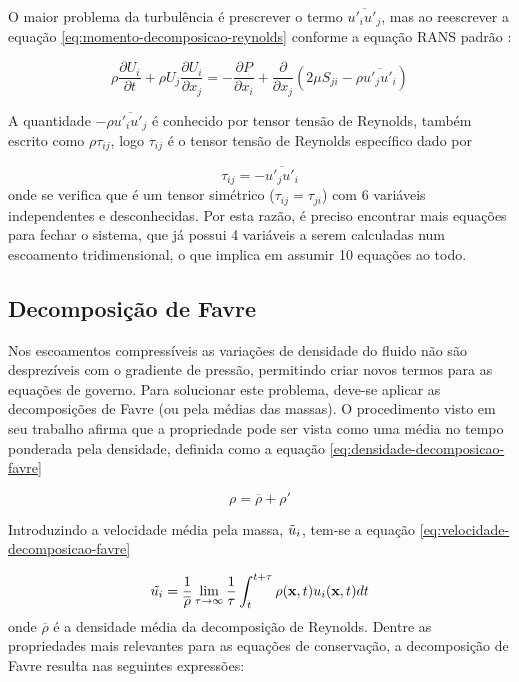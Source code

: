 O maior problema da turbulência é prescrever o termo $\overline{u'_{i}u'_{j}}$, mas ao reescrever a equação \ref{eq:momento-decomposicao-reynolds} conforme a equação RANS padrão \cite{Wilcox2006}:

\begin{equation}
	\rho\frac{\partial U_i}{\partial t} + \rho U_{j}\frac{\partial U_i}{\partial x_j} = -\frac{\partial P}{\partial x_i} + \frac{\partial}{\partial x_j}\left(2\mu S_{ji} - \rho\overline{u'_j u'_i} \right)
\end{equation}

A quantidade $-\rho\overline{u'_{i}u'_{j}}$ é conhecido por tensor tensão de Reynolds, também escrito como $\rho\tau_{ij}$, logo $\tau_{ij}$ é o tensor tensão de Reynolds específico dado por

\begin{equation}
	\tau_{ij} = -\overline{u'_j u'_i}
\end{equation}
%
onde se verifica que é um tensor simétrico ($\tau_{ij} = \tau_{ji}$) com 6 variáveis independentes e desconhecidas. Por esta razão, é preciso encontrar mais equações para fechar o sistema, que já possui 4 variáveis a serem calculadas num escoamento tridimensional, o que implica em assumir 10 equações ao todo.

\subsection{Decomposição de Favre}

Nos escoamentos compressíveis as variações de densidade do fluido não são desprezíveis com o gradiente de pressão, permitindo criar novos termos para as equações de governo. Para solucionar este problema, deve-se aplicar as decomposições de Favre (ou pela médias das massas). O procedimento visto em seu trabalho afirma que a propriedade pode ser vista como uma média no tempo ponderada pela densidade, definida como a equação \ref{eq:densidade-decomposicao-favre}

\begin{equation} 
	\label{eq:densidade-decomposicao-favre}
    \rho = \overline{\rho} + \rho'
\end{equation}

Introduzindo a velocidade média pela massa, $\Tilde{u}_i$, tem-se a equação \ref{eq:velocidade-decomposicao-favre}

\begin{equation}
	\label{eq:velocidade-decomposicao-favre}
	\Tilde{u_{i}} = \frac{1}{\overline{\rho}}\lim_{\tau \rightarrow \infty} \frac{1}{\tau}\int_{t}^{t+\tau}\rho(\textbf{x},t)u_i(\textbf{x},t)dt
\end{equation}
%
onde $\overline{\rho}$ é a densidade média da decomposição de Reynolds. Dentre as propriedades mais relevantes para as equações de conservação, a decomposição de Favre resulta nas seguintes expressões:

